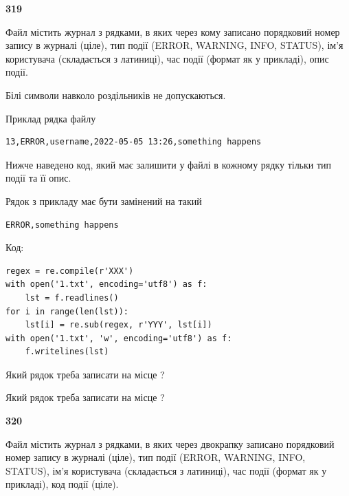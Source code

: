 \newpage

{\begin {center}\textbf{ 319}\end {center}}\par
Файл  містить журнал з рядками, в яких через кому записано поряд\-ко\-вий номер запису в журналі (ціле), тип події (ERROR, WARNING, INFO, STATUS), ім'я користувача (складається з латиниці), час події (фор\-мат як у прикладі), опис події.

Білі символи навколо роздільників не допускаються.

Приклад рядка файлу



\begin{verbatim}
13,ERROR,username,2022-05-05 13:26,something happens
\end{verbatim}


Нижче наведено код, який має залишити у файлі в кожному рядку тільки тип події та її опис.

Рядок з прикладу має бути замінений на такий



\begin{verbatim}
ERROR,something happens
\end{verbatim}




Код:



\begin{verbatim}
regex = re.compile(r'XXX')
with open('1.txt', encoding='utf8') as f:
    lst = f.readlines()
for i in range(len(lst)):
    lst[i] = re.sub(regex, r'YYY', lst[i])
with open('1.txt', 'w', encoding='utf8') as f:
    f.writelines(lst)
\end{verbatim}









Який рядок треба записати на місце  ?\par
\vspace{5mm}


Який рядок треба записати на місце  ?\par


\newpage

{\begin {center}\textbf{ 320}\end {center}}\par
Файл  містить журнал з рядками, в яких через двокрапку записано поряд\-ко\-вий номер запису в журналі (ціле), тип події (ERROR, WARNING, INFO, STATUS), ім'я користувача (складається з латиниці), час події (фор\-мат як у прикладі), код події (ціле).

